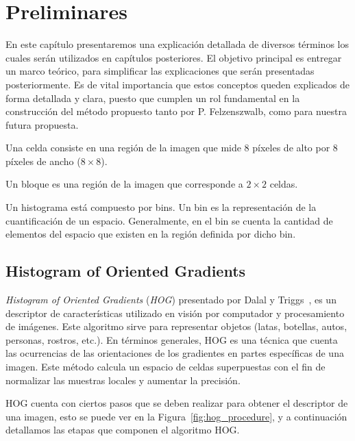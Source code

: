 \chapter[Preliminares ]{Preliminares }\label{ch:capitulo3}

En este capítulo presentaremos una explicación detallada de diversos términos los cuales serán utilizados en capítulos posteriores. El objetivo principal es entregar un marco teórico, para simplificar las explicaciones que serán presentadas posteriormente. Es de vital importancia que estos conceptos queden explicados de forma detallada y clara, puesto que cumplen un rol fundamental en la construcción del método propuesto tanto por P. Felzenszwalb, como para nuestra futura propuesta.

\begin{definition}[Celdas]
\label{def:cel}
Una celda consiste en una región de la imagen que mide $8$ píxeles de alto por $8$ píxeles de ancho ($8 \times 8$).
\end{definition}

\begin{definition}[Bloques]
\label{def:blo}
Un bloque es una región de la imagen que corresponde a $2 \times 2$ celdas.
\end{definition}

\begin{definition}[Bins]
\label{def:bin}
Un histograma está compuesto por bins. Un bin es la representación de la cuantificación de un espacio. Generalmente, en el bin se cuenta la cantidad de elementos del espacio que existen en la región definida por dicho bin.
\end{definition}

\section{Histogram of Oriented Gradients}\label{subsec:hog}
\textit{Histogram of Oriented Gradients} (\textit{HOG}) presentado por Dalal y Triggs~\cite{hog2005}, es un descriptor de características utilizado en visión por computador y procesamiento de imágenes. Este algoritmo sirve para representar objetos (latas, botellas, autos, personas, rostros, etc.). En términos generales, HOG es una técnica que cuenta las ocurrencias de las orientaciones de los gradientes en partes específicas de una imagen. Este método calcula un espacio de celdas superpuestas con el fin de normalizar las muestras locales y aumentar la precisión.

HOG cuenta con ciertos pasos que se deben realizar para obtener el descriptor de una imagen, esto se puede ver en la Figura~\ref{fig:hog_procedure}, y a continuación detallamos las etapas que componen el algoritmo HOG.

